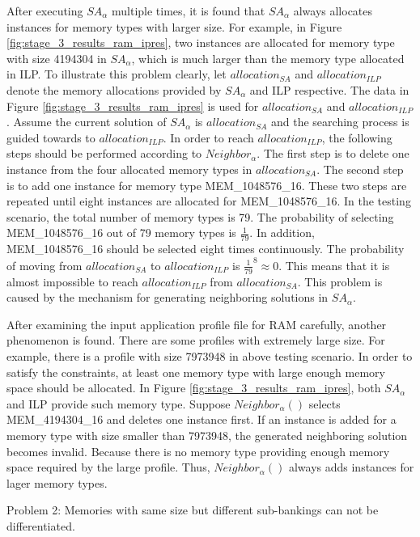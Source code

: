 		After executing $SA_{\alpha}$ multiple times, it is found that $SA_{\alpha}$ always
		allocates instances for memory types with larger size. For example, in Figure
		\ref{fig:stage_3_results_ram_ipres}, two instances are allocated for memory type with size
		4194304 in $SA_{\alpha}$, which is much larger than the memory type allocated in
		ILP. To illustrate this problem clearly, let $allocation_{SA}$ and $allocation_{ILP}$
		denote the memory allocations provided by $SA_{\alpha}$ and ILP respective. The data
		in Figure \ref{fig:stage_3_results_ram_ipres} is used for $allocation_{SA}$ and $allocation_{ILP}$.
		Assume the current solution of $SA_{\alpha}$ is $allocation_{SA}$ and the searching
		process is guided towards to $allocation_{ILP}$. In order to reach $allocation_{ILP}$,
		the following steps should be performed according to $Neighbor_{\alpha}$.
		The first step is to delete one instance from the four allocated memory types in $allocation_{SA}$.
		The second step is to add one instance for memory type MEM\_1048576\_16.
		These two steps are repeated until eight instances are allocated for MEM\_1048576\_16.
		In the testing scenario, the total number of memory types is 79.
		The probability of selecting MEM\_1048576\_16 out of 79 memory types is $\frac{1}{79}$.
		In addition, MEM\_1048576\_16 should be selected eight times continuously. The
		probability of moving from $allocation_{SA}$ to $allocation_{ILP}$ is
		$\frac{1}{79}^{8} \approx 0$. This means that it is almost impossible to reach
		$allocation_{ILP}$ from $allocation_{SA}$. This problem is caused by the mechanism
		for generating neighboring solutions in $SA_{\alpha}$.
		
		After examining the input application profile file for RAM carefully, another phenomenon is found.
		There are some profiles with extremely large size. For example, there is a profile with size 7973948
		in above testing scenario. In order to satisfy the constraints, at least one memory type with
		large enough memory space should be allocated. In Figure \ref{fig:stage_3_results_ram_ipres}, both
		$SA_{\alpha}$ and ILP provide such memory type. Suppose $Neighbor_{\alpha}()$ selects
		MEM\_4194304\_16 and deletes one instance first. If an instance is added for a memory type with
		size smaller than 7973948, the generated neighboring solution becomes invalid. Because
		there is no memory type providing enough memory space required by the large profile.
		Thus, $Neighbor_{\alpha}()$ always adds instances for lager memory types.
		
		Problem 2: Memories with same size but different sub-bankings can not be differentiated.
		
